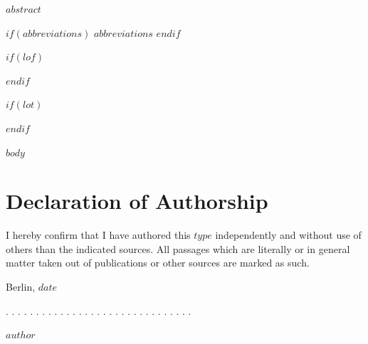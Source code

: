 \documentclass[a4paper,11pt]{article}
\newcommand{\thesistype}{$type$}
\newcommand{\thesisauthor}{$author$}
\newcommand{\thesisdate}{$date$}
\begin{document}
\newpage
$abstract$

\newpage
\tableofcontents
\clearpage

$if(abbreviations)$
\newpage
$abbreviations$
$endif$

$if(lof)$
\newpage
\listoffigures
{}
$endif$

$if(lot)$
\newpage
\listoftables
{}
$endif$

\newpage
\pagestyle{plain}       
\setcounter{page}{1}    %

$body$



\newpage
\thispagestyle{empty}
\hypertarget{declaration-of-authorship}{%
\section*{Declaration of Authorship}\label{declaration-of-authorship}}

I hereby confirm that I have authored this \thesistype{} independently and
without use of others than the indicated sources. All passages which are
literally or in general matter taken out of publications or other sources are
marked as such.
\vspace{1cm}

Berlin, \thesisdate{}
\vspace{3cm}

. . . . . . . . . . . . . . . . . . . . . . . . . . . . . . .
\vspace{0.1cm}

\thesisauthor{}
\end{document}
